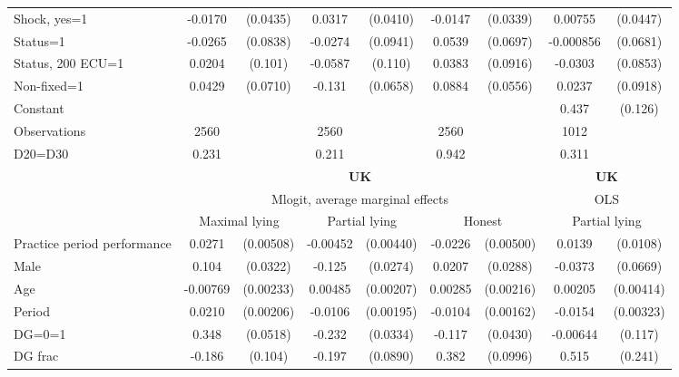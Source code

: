 \begin{tabular}{l|cccccc|cc}
Shock, yes=1    &  -0.0170         & (0.0435)&   0.0317         & (0.0410)&  -0.0147         & (0.0339)&  0.00755         & (0.0447)\\
Status=1        &  -0.0265         & (0.0838)&  -0.0274         & (0.0941)&   0.0539         & (0.0697)&-0.000856         & (0.0681)\\
Status, 200 ECU=1&   0.0204         &  (0.101)&  -0.0587         &  (0.110)&   0.0383         & (0.0916)&  -0.0303         & (0.0853)\\
Non-fixed=1     &   0.0429         & (0.0710)&   -0.131\sym{**} & (0.0658)&   0.0884         & (0.0556)&   0.0237         & (0.0918)\\
Constant        &                  &         &                  &         &                  &         &    0.437\sym{***}&  (0.126)\\
\hline
Observations    &     2560         &         &     2560         &         &     2560         &         &     1012         &         \\
D20=D30         &    0.231         &         &    0.211         &         &    0.942         &         &    0.311         &         \\
\hline\hline
&\multicolumn{6}{c|}{\bf UK}&\multicolumn{2}{c}{\bf UK}\\ &\multicolumn{6}{c|}{Mlogit, average marginal effects }&\multicolumn{2}{c}{OLS}\\
                &\multicolumn{2}{c}{Maximal lying}&\multicolumn{2}{c}{Partial lying}&\multicolumn{2}{c|}{Honest}  &\multicolumn{2}{c}{Partial lying}\\
\hline
Practice period performance&   0.0271\sym{***}&(0.00508)& -0.00452         &(0.00440)&  -0.0226\sym{***}&(0.00500)&   0.0139         & (0.0108)\\
Male            &    0.104\sym{***}& (0.0322)&   -0.125\sym{***}& (0.0274)&   0.0207         & (0.0288)&  -0.0373         & (0.0669)\\
Age             & -0.00769\sym{***}&(0.00233)&  0.00485\sym{**} &(0.00207)&  0.00285         &(0.00216)&  0.00205         &(0.00414)\\
Period          &   0.0210\sym{***}&(0.00206)&  -0.0106\sym{***}&(0.00195)&  -0.0104\sym{***}&(0.00162)&  -0.0154\sym{***}&(0.00323)\\
DG=0=1          &    0.348\sym{***}& (0.0518)&   -0.232\sym{***}& (0.0334)&   -0.117\sym{***}& (0.0430)& -0.00644         &  (0.117)\\
DG frac         &   -0.186\sym{*}  &  (0.104)&   -0.197\sym{**} & (0.0890)&    0.382\sym{***}& (0.0996)&    0.515\sym{**} &  (0.241)\\

\end{tabular}
